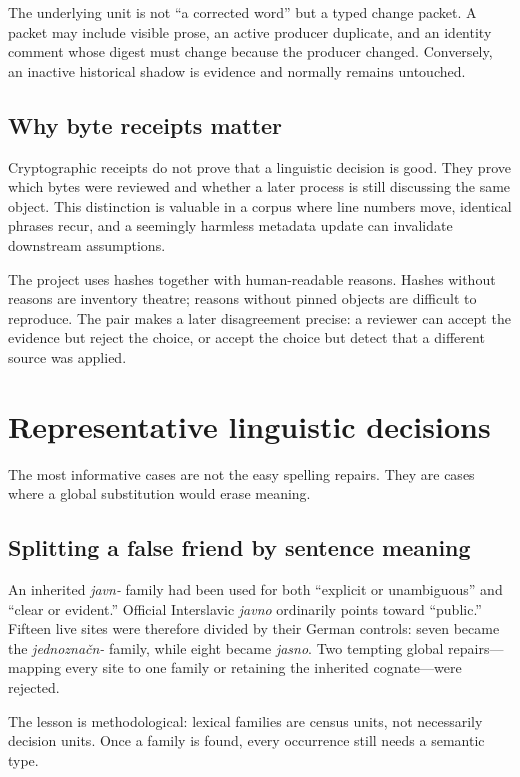\documentclass[11pt,a4paper]{article}
\newcommand{\term}[1]{\textit{#1}}
\begin{document}
The underlying unit is not ``a corrected word'' but a typed change packet. A packet may include visible prose, an active producer duplicate, and an identity comment whose digest must change because the producer changed. Conversely, an inactive historical shadow is evidence and normally remains untouched.

\subsection{Why byte receipts matter}

Cryptographic receipts do not prove that a linguistic decision is good. They prove which bytes were reviewed and whether a later process is still discussing the same object. This distinction is valuable in a corpus where line numbers move, identical phrases recur, and a seemingly harmless metadata update can invalidate downstream assumptions.

The project uses hashes together with human-readable reasons. Hashes without reasons are inventory theatre; reasons without pinned objects are difficult to reproduce. The pair makes a later disagreement precise: a reviewer can accept the evidence but reject the choice, or accept the choice but detect that a different source was applied.

\section{Representative linguistic decisions}

The most informative cases are not the easy spelling repairs. They are cases where a global substitution would erase meaning.

\subsection{Splitting a false friend by sentence meaning}

An inherited \term{javn-} family had been used for both ``explicit or unambiguous'' and ``clear or evident.'' Official Interslavic \term{javno} ordinarily points toward ``public.'' Fifteen live sites were therefore divided by their German controls: seven became the \term{jednoznačn-} family, while eight became \term{jasno}. Two tempting global repairs---mapping every site to one family or retaining the inherited cognate---were rejected.

The lesson is methodological: lexical families are census units, not necessarily decision units. Once a family is found, every occurrence still needs a semantic type.
\end{document}

